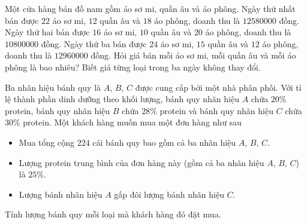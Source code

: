 \begin{bt}
	Một cửa hàng bán đồ nam gồm áo sơ mi, quần âu và áo phông. Ngày thứ nhất bán được $22$ áo sơ mi, $12$ quần âu và $18$ áo phông, doanh thu là $12580000$ đồng. Ngày thứ hai bán được $16$ áo sơ mi, $10$ quần âu và $20$ áo phông, doanh thu là $10800000$ đồng. Ngày thứ ba bán được $24$ áo sơ mi, $15$ quần âu và $12$ áo phông, doanh thu là $12960000$ đồng. Hỏi giá bán mỗi áo sơ mi, mỗi quần âu và mỗi áo phông là bao nhiêu? Biết giá từng loại trong ba ngày không thay đổi.
\end{bt}

\begin{bt}
	Ba nhãn hiệu bánh quy là $A$, $B$, $C$ được cung cấp bởi một nhà phân phối. Với tỉ lệ thành phần dinh dưỡng theo khối lượng, bánh quy nhãn hiệu $A$ chứa $20\%$ protein, bánh quy nhãn hiệu $B$ chứa $28\%$ protein và bánh quy nhãn hiệu $C$ chứa $30\%$ protein. Một khách hàng muốn mua một đơn hàng như sau
	\begin{itemize}
		\item Mua tổng cộng $224$ cái bánh quy bao gồm cả ba nhãn hiệu $A$, $B$, $C$.
		\item Lượng protein trung bình của đơn hàng này (gồm cả ba nhãn hiệu $A$, $B$, $C$) là $25\%$.
		\item Lượng bánh nhãn hiệu $A$ gấp đôi lượng bánh nhãn hiệu $C$.
	\end{itemize}
	Tính lượng bánh quy mỗi loại mà khách hàng đó đặt mua.
\end{bt}


